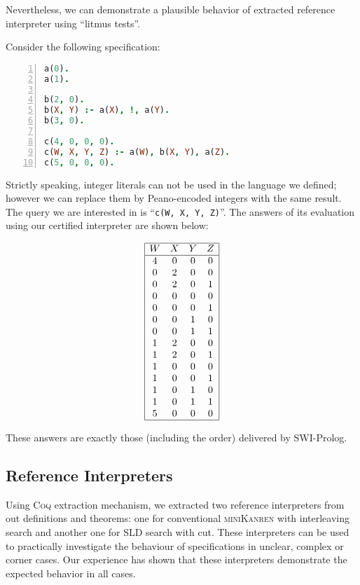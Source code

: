 { \color{red}

Nevertheless, we can demonstrate a plausible behavior of extracted reference interpreter using ``litmus tests''.

Consider the following specification:


\begin{lstlisting}[language=Prolog,numbers=left,stepnumber=1]
a(0).
a(1).

b(2, 0).
b(X, Y) :- a(X), !, a(Y).
b(3, 0).

c(4, 0, 0, 0).
c(W, X, Y, Z) :- a(W), b(X, Y), a(Z).
c(5, 0, 0, 0).
\end{lstlisting}

Strictly speaking, integer literals can not be used in the language we defined; however we can replace them by Peano-encoded
integers with the same result. The query we are interested in is ``\lstinline|c(W, X, Y, Z)|''. The answers of its
evaluation using our certified interpreter are shown below:

\[
\begin{array}{|cccc|}
\hline
W & X & Y & Z \\
\hline
4 & 0 & 0 & 0 \\
0 & 2 & 0 & 0 \\
0 & 2 & 0 & 1 \\
0 & 0 & 0 & 0 \\
0 & 0 & 0 & 1 \\
0 & 0 & 1 & 0 \\
0 & 0 & 1 & 1 \\
1 & 2 & 0 & 0 \\
1 & 2 & 0 & 1 \\
1 & 0 & 0 & 0 \\
1 & 0 & 0 & 1 \\
1 & 0 & 1 & 0 \\
1 & 0 & 1 & 1 \\
5 & 0 & 0 & 0 \\
\hline
\end{array}
\]

These answers are exactly those (including the order) delivered by SWI-Prolog.

}

\subsection{Reference Interpreters}

Using \textsc{Coq} extraction mechanism, we extracted two reference interpreters from out definitions and theorems: one for conventional
\textsc{miniKanren} with interleaving search and another one for SLD search with cut. These interpreters can be used to practically investigate the behaviour
of specifications in unclear, complex or corner cases. Our experience has shown that these interpreters demonstrate the expected behavior
in all cases.
